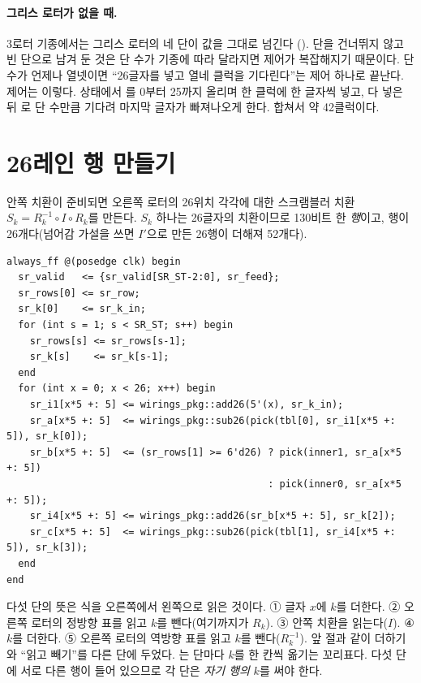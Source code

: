 \paragraph{그리스 로터가 없을 때.} 3로터 기종에서는 그리스 로터의 네 단이 값을 그대로 넘긴다
(). 단을 건너뛰지 않고 빈 단으로 남겨 둔 것은 단 수가 기종에 따라
달라지면 제어가 복잡해지기 때문이다. 단 수가 언제나 열넷이면 ``26글자를 넣고 열네 클럭을 기다린다''는
제어 하나로 끝난다. 제어는 이렇다.  상태에서 를 0부터 25까지 올리며 한 클럭에 한
글자씩 넣고, 다 넣은 뒤 로 단 수만큼 기다려 마지막 글자가 빠져나오게 한다. 합쳐서 약 42클럭이다.

\section{26레인 행 만들기}\label{sec:e-rows}

안쪽 치환이 준비되면 오른쪽 로터의 26위치 각각에 대한 스크램블러 치환 $S_k = R_k^{-1} \circ I \circ R_k$를
만든다. $S_k$ 하나는 26글자의 치환이므로 130비트 한 \emph{행}이고, 행이 26개다(넘어감 가설을 쓰면 $I'$으로
만든 26행이 더해져 52개다).

\begin{lstlisting}[language=SV,caption={\code{bombe\_engine.sv}: 한 클럭에 한 행을 만드는 26레인, 5단.},label={lst:e-rows}]
always_ff @(posedge clk) begin
  sr_valid   <= {sr_valid[SR_ST-2:0], sr_feed};
  sr_rows[0] <= sr_row;
  sr_k[0]    <= sr_k_in;
  for (int s = 1; s < SR_ST; s++) begin
    sr_rows[s] <= sr_rows[s-1];
    sr_k[s]    <= sr_k[s-1];
  end
  for (int x = 0; x < 26; x++) begin
    sr_i1[x*5 +: 5] <= wirings_pkg::add26(5'(x), sr_k_in);
    sr_a[x*5 +: 5]  <= wirings_pkg::sub26(pick(tbl[0], sr_i1[x*5 +: 5]), sr_k[0]);
    sr_b[x*5 +: 5]  <= (sr_rows[1] >= 6'd26) ? pick(inner1, sr_a[x*5 +: 5])
                                             : pick(inner0, sr_a[x*5 +: 5]);
    sr_i4[x*5 +: 5] <= wirings_pkg::add26(sr_b[x*5 +: 5], sr_k[2]);
    sr_c[x*5 +: 5]  <= wirings_pkg::sub26(pick(tbl[1], sr_i4[x*5 +: 5]), sr_k[3]);
  end
end
\end{lstlisting}

다섯 단의 뜻은 식을 오른쪽에서 왼쪽으로 읽은 것이다. ① 글자 $x$에 $k$를 더한다. ② 오른쪽 로터의 정방향 표를
읽고 $k$를 뺀다(여기까지가 $R_k$). ③ 안쪽 치환을 읽는다($I$). ④ $k$를 더한다. ⑤ 오른쪽 로터의 역방향 표를
읽고 $k$를 뺀다($R_k^{-1}$). 앞 절과 같이 더하기와 ``읽고 빼기''를 다른 단에 두었다. 는 단마다
$k$를 한 칸씩 옮기는 꼬리표다. 다섯 단에 서로 다른 행이 들어 있으므로 각 단은 \emph{자기 행의} $k$를 써야
한다.


